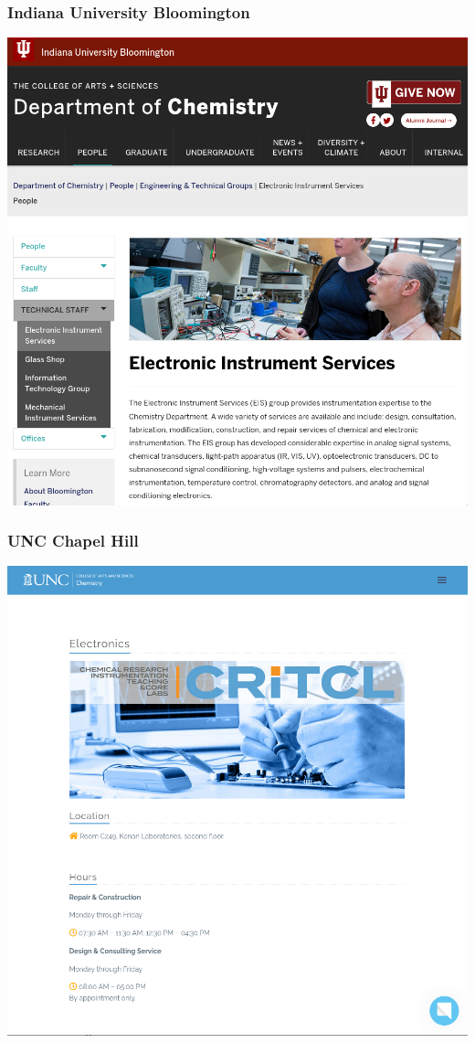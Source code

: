\documentclass{presentation}
\begin{document}
{\begin{frame}\frametitle{Indiana University Bloomington}
  \includegraphics[width=\textwidth]{"./bloom.png"}
\end{frame}

\begin{frame}\frametitle{UNC Chapel Hill}
  \includegraphics[width=\textwidth]{"./unc.png"}
\end{frame}

}
\end{document}
